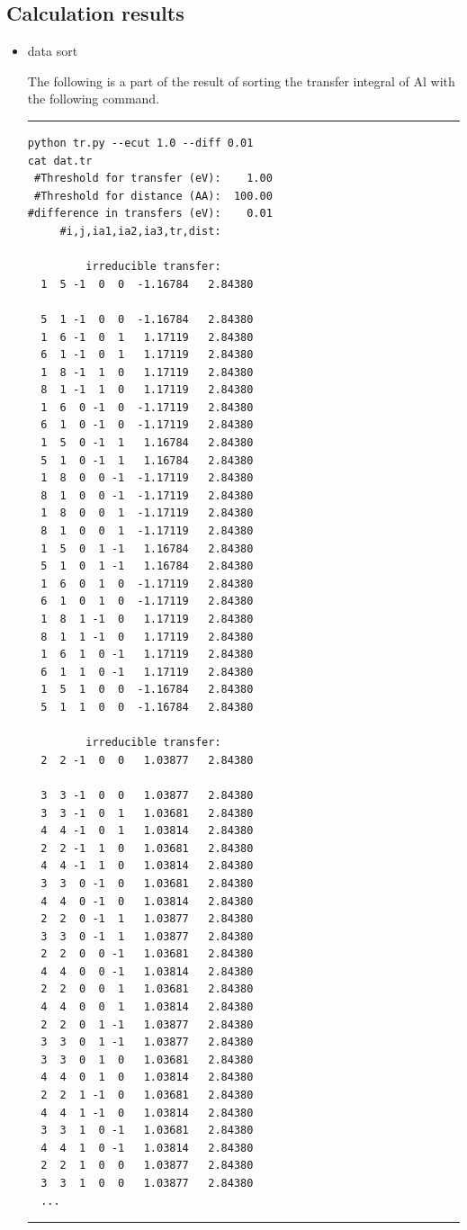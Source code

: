 \documentclass{article}
\begin{document}
\subsection{\label{command}Calculation results}

\begin{itemize}
\item{data sort}

The following is a part of the result of sorting the transfer integral of Al with the following command.
\vspace{3mm}\hrule
\begin{multicols}{2}
\begin{verbatim}
python tr.py --ecut 1.0 --diff 0.01
cat dat.tr 
 #Threshold for transfer (eV):    1.00
 #Threshold for distance (AA):  100.00
#difference in transfers (eV):    0.01
     #i,j,ia1,ia2,ia3,tr,dist:

         irreducible transfer:
  1  5 -1  0  0  -1.16784   2.84380

  5  1 -1  0  0  -1.16784   2.84380
  1  6 -1  0  1   1.17119   2.84380
  6  1 -1  0  1   1.17119   2.84380
  1  8 -1  1  0   1.17119   2.84380
  8  1 -1  1  0   1.17119   2.84380
  1  6  0 -1  0  -1.17119   2.84380
  6  1  0 -1  0  -1.17119   2.84380
  1  5  0 -1  1   1.16784   2.84380
  5  1  0 -1  1   1.16784   2.84380
  1  8  0  0 -1  -1.17119   2.84380
  8  1  0  0 -1  -1.17119   2.84380
  1  8  0  0  1  -1.17119   2.84380
  8  1  0  0  1  -1.17119   2.84380
  1  5  0  1 -1   1.16784   2.84380
  5  1  0  1 -1   1.16784   2.84380
  1  6  0  1  0  -1.17119   2.84380
  6  1  0  1  0  -1.17119   2.84380
  1  8  1 -1  0   1.17119   2.84380
  8  1  1 -1  0   1.17119   2.84380
  1  6  1  0 -1   1.17119   2.84380
  6  1  1  0 -1   1.17119   2.84380
  1  5  1  0  0  -1.16784   2.84380
  5  1  1  0  0  -1.16784   2.84380

         irreducible transfer:
  2  2 -1  0  0   1.03877   2.84380

  3  3 -1  0  0   1.03877   2.84380
  3  3 -1  0  1   1.03681   2.84380
  4  4 -1  0  1   1.03814   2.84380
  2  2 -1  1  0   1.03681   2.84380
  4  4 -1  1  0   1.03814   2.84380
  3  3  0 -1  0   1.03681   2.84380
  4  4  0 -1  0   1.03814   2.84380
  2  2  0 -1  1   1.03877   2.84380
  3  3  0 -1  1   1.03877   2.84380
  2  2  0  0 -1   1.03681   2.84380
  4  4  0  0 -1   1.03814   2.84380
  2  2  0  0  1   1.03681   2.84380
  4  4  0  0  1   1.03814   2.84380
  2  2  0  1 -1   1.03877   2.84380
  3  3  0  1 -1   1.03877   2.84380
  3  3  0  1  0   1.03681   2.84380
  4  4  0  1  0   1.03814   2.84380
  2  2  1 -1  0   1.03681   2.84380
  4  4  1 -1  0   1.03814   2.84380
  3  3  1  0 -1   1.03681   2.84380
  4  4  1  0 -1   1.03814   2.84380
  2  2  1  0  0   1.03877   2.84380
  3  3  1  0  0   1.03877   2.84380
  ...
\end{verbatim}
\end{multicols}
\hrule\vspace{3mm}


\end{itemize}
\end{document}

